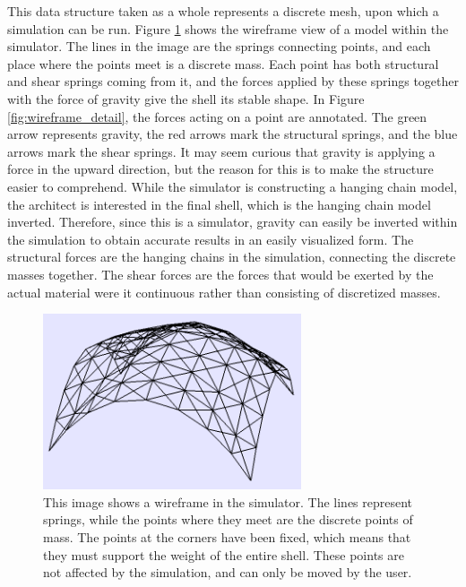 \documentclass{thesis}
\begin{document}
This data structure taken as a whole represents a discrete mesh, upon which a simulation can be run.  Figure \ref{fig:wireframe} shows
the wireframe view of a model within the simulator.  The lines in the image are the springs connecting points, and each place where
the points meet is a discrete mass.  Each point has both structural and shear springs coming from it, and the forces applied by these
springs together with the force of gravity give the shell its stable shape.  In Figure \ref{fig:wireframe_detail}, the forces acting on
a point are annotated.  The green arrow represents gravity, the red arrows mark the structural springs, and the blue arrows mark the
shear springs.  It may seem curious that gravity is applying a force in the upward direction, but the reason for this is to make the
structure easier to comprehend.  While the simulator is constructing a hanging chain model, the architect is interested in the final
shell, which is the hanging chain model inverted.  Therefore, since this is a simulator, gravity can easily be inverted within the
simulation to obtain accurate results in an easily visualized form.  The structural forces are the hanging chains in the simulation,
connecting the discrete masses together.  The shear forces are the forces that would be exerted by the actual material were it
continuous rather than consisting of discretized masses.

\begin{figure}
\centering
\includegraphics[width=3in]{images/wireframe.png}
\caption[A wireframe of a simulated model]{This image shows a wireframe in the simulator.  The lines represent springs, while the points
where they meet are the discrete points of mass.  The points at the corners have been fixed, which means that they must support the weight
of the entire shell.  These points are not affected by the simulation, and can only be moved by the user.}
\label{fig:wireframe}
\end{figure}
\end{document}
